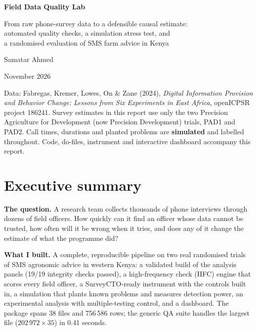 \documentclass[11pt,a4paper]{article}
\begin{document}
\thispagestyle{empty}
\vspace*{1.2cm}
{\color{white}\sffamily
{\Huge\bfseries Field Data Quality Lab\par}\vspace{0.6em}
{\Large From raw phone-survey data to a defensible causal estimate:\\[2pt] automated quality checks, a simulation stress test, and\\[2pt] a randomised evaluation of SMS farm advice in Kenya\par}}
\vspace{5.6cm}
{\sffamily\large Samatar Ahmed\par}
{\sffamily\color{mute} November 2026\par}
\vspace{1.2em}
\begin{minipage}{0.82\textwidth}\small
Data: Fabregas, Kremer, Lowes, On \& Zane (2024), \emph{Digital Information Provision and Behavior Change: Lessons from Six Experiments in East Africa}, openICPSR project 186241. Survey estimates in this report use only the two Precision Agriculture for Development (now Precision Development) trials, PAD1 and PAD2. Call times, durations and planted problems are \textbf{simulated} and labelled throughout. Code, do-files, instrument and interactive dashboard accompany this report.
\end{minipage}
\clearpage
\tableofcontents
\clearpage

\section*{Executive summary}
\textbf{The question.} A research team collects thousands of phone interviews through dozens of field officers. How quickly can it find an officer whose data cannot be trusted, how often will it be wrong when it tries, and does any of it change the estimate of what the programme did?

\textbf{What I built.} A complete, reproducible pipeline on two real randomised trials of SMS agronomic advice in western Kenya: a validated build of the analysis panels (19/19 integrity checks passed), a high-frequency check (HFC) engine that scores every field officer, a SurveyCTO-ready instrument with the controls built in, a simulation that plants known problems and measures detection power, an experimental analysis with multiple-testing control, and a dashboard. The package spans 38 files and 756\,586 rows; the generic QA suite handles the largest file ($202\,972\times35$) in 0.41 seconds.
\end{document}
